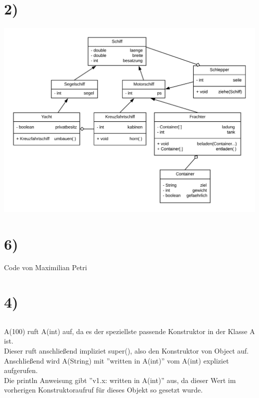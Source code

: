 \documentclass[12pt]{article}
\date{}
\begin{document}
\section{2)}
\includegraphics[width=1\textwidth]{Klassendiagramm.png}

\section{6)}
\begin{center}
    Code von Maximilian Petri
\end{center}
\pagebreak

\section{4)}
\subsection{}
\subsubsection{}
\begin{center}
    A(100) ruft A(int) auf, da es der speziellste passende Konstruktor in der Klasse A ist.\\
    Dieser ruft anschließend impliziet super(), also den Konstruktor von Object auf.\\
    Anschließend wird A(String) mit ''written in A(int)'' vom A(int) expliziet aufgerufen.\\
    Die println Anweisung gibt ''v1.x: written in A(int)'' aus, da dieser Wert im vorherigen Konstruktoraufruf für dieses Objekt so gesetzt wurde.
\end{center}
\end{document}

